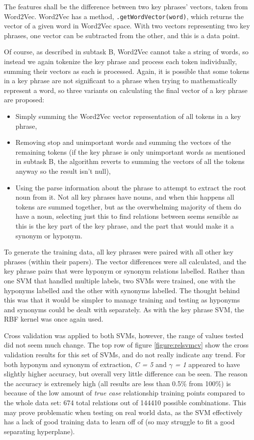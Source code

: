 The features shall be the difference between two key phrases' vectors, taken from Word2Vec. Word2Vec has a method, \texttt{.getWordVector(word)}, which returns the vector of a given word in Word2Vec space. With two vectors representing two key phrases, one vector can be subtracted from the other, and this is a data point.

Of course, as described in subtask B, Word2Vec cannot take a string of words, so instead we again tokenize the key phrase and process each token individually, summing their vectors as each is processed. Again, it is possible that some tokens in a key phrase are not significant to a phrase when trying to mathematically represent a word, so three variants on calculating the final vector of a key phrase are proposed:
\begin{itemize}
	\item Simply summing the Word2Vec vector representation of all tokens in a key phrase,
	\item Removing stop and unimportant words and summing the vectors of the remaining tokens (if the key phrase is only unimportant words as mentioned in subtask B, the algorithm reverts to summing the vectors of all the tokens anyway so the result isn't null),
	\item Using the parse information about the phrase to attempt to extract the root noun from it. Not all key phrases have nouns, and when this happens all tokens are summed together, but as the overwhelming majority of them do have a noun, selecting just this to find relations between seems sensible as this is the key part of the key phrase, and the part that would make it a synonym or hyponym.
\end{itemize}

To generate the training data, all key phrases were paired with all other key phrases (within their papers). The vector differences were all calculated, and the key phrase pairs that were hyponym or synonym relations labelled. Rather than one SVM that handled multiple labels, two SVMs were trained, one with the hyponyms labelled and the other with synonyms labelled. The thought behind this was that it would be simpler to manage training and testing as hyponyms and synonyms could be dealt with separately. As with the key phrase SVM, the RBF kernel was once again used.

Cross validation was applied to both SVMs, however, the range of values tested did not seem much change. The top row of figure \ref{figure:relsvmcv} show the cross validation results for this set of SVMs, and do not really indicate any trend. For both hyponym and synonym of extraction, \textit{C = 5} and \textit{$\gamma$ = 1} appeared to have slightly higher accuracy, but overall very little difference can be seen. The reason the accuracy is extremely high (all results are less than 0.5\% from 100\%) is because of the low amount of \textit{true case} relationship training points compared to the whole data set: 674 total relations out of 144410 possible combinations. This may prove problematic when testing on real world data, as the SVM effectively has a lack of good training data to learn off of (so may struggle to fit a good separating hyperplane).

